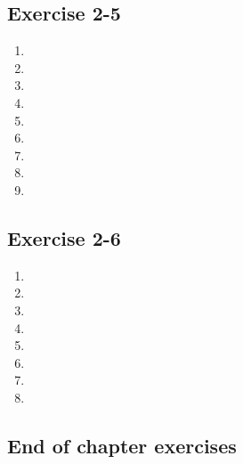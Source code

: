 \subsection{Exercise 2-5} %
\begin{enumerate}[itemsep=5pt, label=\textbf{\arabic*}. ] 
\item %
\item %
\item %
\item %
\item %
\item %
\item %
\item %
\item %
\end{enumerate}

\subsection{Exercise 2-6} %

\begin{enumerate}[itemsep=6pt, label=\textbf{\arabic*}. ] 
    \item %
    \item %
    \item %
    \item %
    \item %
    \item %
    \item %
\item %
    \end{enumerate}
% 
\subsection{End of chapter exercises} %

